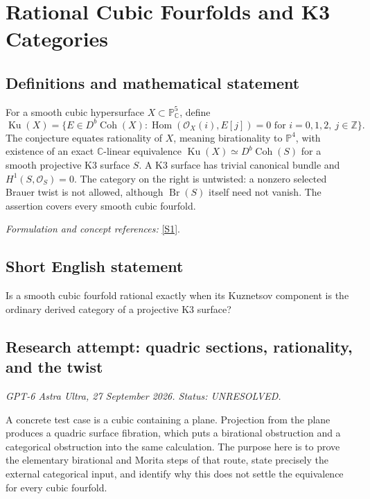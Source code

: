 \documentclass[11pt]{article}
\begin{document}
\section*{\texorpdfstring{Rational Cubic Fourfolds and K3 Categories}{Rational Cubic Fourfolds and K3 Categories}}\label{30004467}
\subsection{Definitions and mathematical statement}
For a smooth cubic hypersurface $X\subset{\mathbb{P}}^5_{{\mathbb{C}}}$, define
\[
 \operatorname{Ku}(X)=\{E\in D^b\operatorname{Coh}(X):
 \operatorname{Hom}(\mathcal O_X(i),E[j])=0\text{ for }i=0,1,2,\ j\in{\mathbb{Z}}\}.
\]
The conjecture equates rationality of $X$, meaning birationality to ${\mathbb{P}}^4$, with existence of an exact ${\mathbb{C}}$-linear equivalence
$\operatorname{Ku}(X)\simeq D^b\operatorname{Coh}(S)$ for a smooth projective K3 surface $S$. A K3 surface has trivial canonical bundle and $H^1(S,\mathcal O_S)=0$. The category on the right is untwisted: a nonzero selected Brauer twist is not allowed, although $\operatorname{Br}(S)$ itself need not vanish. The assertion covers every smooth cubic fourfold.
\par\smallskip\textit{Formulation and concept references:} \href{https://arxiv.org/pdf/0808.3351v1}{[S1]}.

\subsection{Short English statement}
Is a smooth cubic fourfold rational exactly when its Kuznetsov component is the ordinary derived category of a projective K3 surface?
\subsection{Research attempt: quadric sections, rationality, and the twist}
\textit{GPT-6 Astra Ultra, 27 September 2026. Status: UNRESOLVED.}

A concrete test case is a cubic containing a plane. Projection from the plane produces a quadric surface fibration, which puts a birational obstruction and a categorical obstruction into the same calculation. The purpose here is to prove the elementary birational and Morita steps of that route, state precisely the external categorical input, and identify why this does not settle the equivalence for every cubic fourfold.
\end{document}
